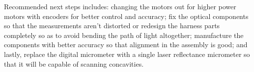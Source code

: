 \documentclass{article}
\begin{document}
Recommended next steps includes: changing the motors out for higher power motors with encoders for 
better control and accuracy; fix the optical components so that the measurements aren't distorted or 
redesign the harness parts completely so as to avoid bending the path of light altogether; manufacture the 
components with better accuracy so that alignment in the assembly is good; and lastly, replace the digital 
micrometer with a single laser reflectance micrometer so that it will be capable of scanning concavities.


\newpage
{}


\end{document}
